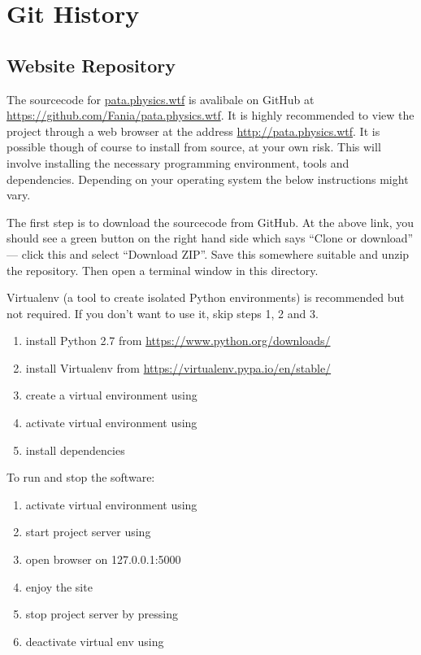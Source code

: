 
\chapter{Git History}
\label{app:git}

\vspace{5cm}


\section{Website Repository}
\label{s:gitweb}

The sourcecode for \url{pata.physics.wtf} is avalibale on GitHub at \url{https://github.com/Fania/pata.physics.wtf}. It is highly recommended to view the project through a web browser at the address \url{http://pata.physics.wtf}. It is possible though of course to install from source, at your own risk. This will involve installing the necessary programming environment, tools and dependencies. Depending on your operating system the below instructions might vary. 

The first step is to download the sourcecode from GitHub. At the above link, you should see a green button on the right hand side which says ``Clone or download'' --- click this and select ``Download ZIP''. Save this somewhere suitable and unzip the repository. Then open a terminal window in this directory.

Virtualenv (a tool to create isolated Python environments) is recommended but not required. If you don't want to use it, skip steps 1, 2 and 3.

\begin{enumerate}
  \item install Python 2.7 from \url{https://www.python.org/downloads/}
  \item install Virtualenv from \url{https://virtualenv.pypa.io/en/stable/}
  \item create a virtual environment using 
  \item activate virtual environment using 
  \item install dependencies 
\end{enumerate}

To run and stop the software:

\begin{enumerate}
  \item activate virtual environment using 
  \item start project server using 
  \item open browser on 127.0.0.1:5000
  \item enjoy the site
  \item stop project server by pressing 
  \item deactivate virtual env using 
\end{enumerate}

